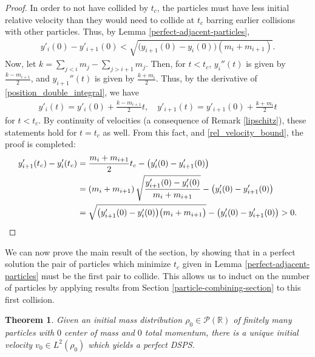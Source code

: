 \documentclass[11pt]{article}
\newtheorem{theorem}{Theorem}[section]
\numberwithin{equation}{section}
\begin{document}
        \begin{proof}
            In order to not have collided by $t_c$, the particles must have less initial relative velocity than they would need to collide at $t_c$ barring earlier collisions with other particles. Thus, by Lemma \ref{perfect-adjacent-particles},
            \begin{align} \label{rel_velocity_bound}
                y'_i(0) - y'_{i+1}(0) < \sqrt{ \big( y_{i+1}(0) - y_i(0) \big) ( m_i + m_{i+1})}.
            \end{align}
            Now, let $k = \sum_{j < i}{m_j} - \sum_{j > i + 1}{m_j}$. Then, for $t < t_c$, $y_i''(t)$ is given by $\frac{k-m_{i+1}}{2}$, and $y_{i+1}''(t)$ is given by $\frac{k+m_{i}}{2}$. Thus, by the derivative of \eqref{position_double_integral}, we have
            \begin{align*}
                y'_i(t) = y'_i(0) + \frac{k - m_{i+1}}{2} t,\quad  
                y'_{i+1}(t) = y'_{i+1}(0) + \frac{k + m_i}{2} t
            \end{align*}
            for $t<t_c$. By continuity of velocities (a consequence of Remark \ref{lipschitz}), these statements hold for $t=t_c$ as well. From this fact, and \eqref{rel_velocity_bound}, the proof is completed:
            \begin{align*}
                y'_{i+1}(t_c) - y'_i(t_c) %
                &= \frac{m_i + m_{i+1}}{2} t_c - \big( y'_i(0) - y'_{i+1}(0) \big) \\
                &= \left( m_i + m_{i+1} \right) \sqrt{\frac{y'_{i+1}(0) - y'_{i}(0)}{m_i + m_{i+1}}} - \big( y'_i(0) - y'_{i+1}(0) \big) \\
                & = \sqrt{\big( y'_{i+1}(0) - y'_{i}(0) \big) \big( m_i + m_{i+1} \big)} - \big( y'_i(0) - y'_{i+1}(0) \big) %
                > 0. \qedhere
            \end{align*}
        \end{proof}
            We can now prove the main result of the section, by showing that in a perfect solution the pair of particles which minimize $t_c$ given in Lemma \ref{perfect-adjacent-particles} must be the first pair to collide. This allows us to induct on the number of particles by applying results from Section \ref{particle-combining-section} to this first collision.
        \begin{theorem} \label{perfect_e_and_u}
            Given an initial mass distribution $\rho_0\in\mathcal{P}(\mathbb{R})$ of finitely many particles with $0$ center of mass and $0$ total momentum, there is a unique initial velocity $v_0\in L^2(\rho_0)$ which yields a perfect DSPS.
        \end{theorem}
\end{document}

